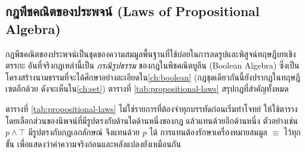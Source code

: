 \subsection{กฎพีชคณิตของประพจน์ (Laws of Propositional Algebra)}

กฎพีชคณิตของประพจน์เป็นชุดของความสมมูลพื้นฐานที่ใช้บ่อยในการลดรูปและพิสูจน์ทฤษฎีบทเชิงตรรกะ อันที่จริงกฎเหล่านี้เป็น \emph{กรณีรูปธรรม} ของกฎในพีชคณิตบูลีน (Boolean Algebra) ซึ่งเป็นโครงสร้างนามธรรมที่จะได้ศึกษาอย่างละเอียดใน\autoref{ch:boolean} (กฎชุดเดียวกันนี้ยังปรากฏในทฤษฎีเซตอีกด้วย ดังจะเห็นใน\autoref{ch:set}) ตารางที่ \ref{tab:propositional-laws} สรุปกฎที่สำคัญทั้งหมด~\parencite{rosen2019discrete}

ตารางที่ \ref{tab:propositional-laws} ไม่ใช่รายการที่ต้องจำทุกบรรทัดก่อนเริ่มทำโจทย์ ให้ใช้ตารางโดยเลือกส่วนของนิพจน์ที่มีรูปตรงกับด้านใดด้านหนึ่งของกฎ แล้วแทนด้วยอีกด้านหนึ่ง ตัวอย่างเช่น $p\land \top$ มีรูปตรงกับกฎเอกลักษณ์ จึงแทนด้วย $p$ ได้ การแทนต้องรักษาเครื่องหมายสมมูล $\equiv$ ไว้ทุกขั้น เพื่อแสดงว่าค่าความจริงก่อนและหลังแปลงยังเหมือนกัน

